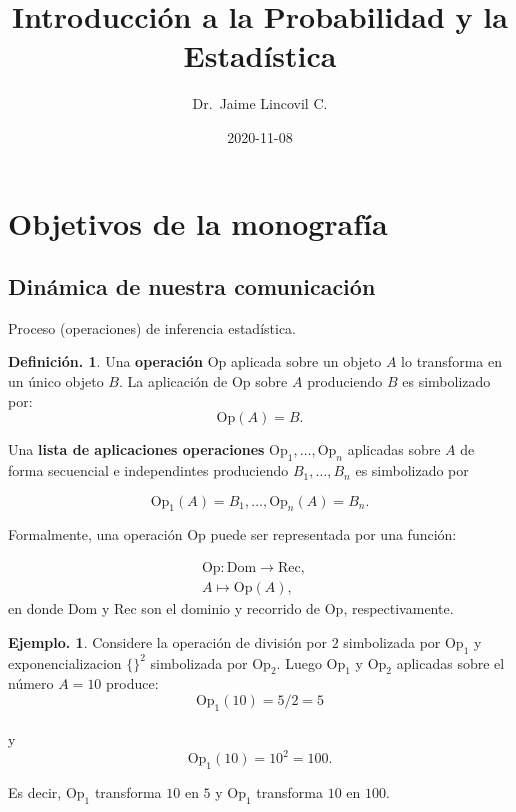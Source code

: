 \documentclass[]{book}
\title{Introducción a la Probabilidad y la Estadística}
\author{Dr.~Jaime Lincovil C.}
\date{2020-11-08}
\theoremstyle{definition}
\newtheorem{definition}{Definición.}[chapter]
\theoremstyle{definition}
\newtheorem{example}{Ejemplo.}[chapter]
\theoremstyle{definition}
\theoremstyle{remark}
\begin{document}
\maketitle

{
\setcounter{tocdepth}{1}
\tableofcontents
}
\hypertarget{objetivos-de-la-monografuxeda}{%
\chapter*{Objetivos de la monografía}\label{objetivos-de-la-monografuxeda}}

\hypertarget{dinuxe1mica-de-nuestra-comunicaciuxf3n}{%
\section*{Dinámica de nuestra comunicación}\label{dinuxe1mica-de-nuestra-comunicaciuxf3n}}

Proceso (operaciones) de inferencia estadística.

\begin{definition}
\protect\hypertarget{def:unnamed-chunk-1}{}{\label{def:unnamed-chunk-1} }Una \textbf{operación} Op aplicada sobre un objeto \(A\) lo transforma en
un único objeto \(B\). La aplicación de Op
sobre \(A\) produciendo \(B\) es simbolizado por:
\[\mbox{Op}(A)=B.\]

Una \textbf{lista de aplicaciones operaciones} \(\mbox{Op}_1, \ldots, \mbox{Op}_n\) aplicadas sobre \(A\) de forma secuencial e
independintes produciendo \(B_1, \ldots, B_n\) es simbolizado por

\[ \mbox{Op}_1 (A)=B_1, \ldots, \mbox{Op}_n (A) = B_n.  \]
\end{definition}

Formalmente, una operación Op puede ser representada por una
función:

\[
\begin{aligned}
\mbox{Op}: \mbox{Dom} \to \mbox{Rec}, & \\
A \mapsto \mbox{Op}(A),&
\end{aligned}
\]
en donde Dom y Rec son el dominio y recorrido de Op,
respectivamente.

\begin{example}
\protect\hypertarget{exm:unnamed-chunk-2}{}{\label{exm:unnamed-chunk-2} }Considere la operación de división por \(2\) simbolizada por
\(\mbox{Op}_1\) y exponencializacion \(\{ \}^2\) simbolizada por
\(\mbox{Op}_2\). Luego \(\mbox{Op}_1\) y \(\mbox{Op}_2\) aplicadas sobre
el número \(A=10\) produce:
\[ \mbox{Op}_1(10) = 5/2= 5  \]\\
y
\[ \mbox{Op}_1(10) =10^2 =100.  \]

Es decir, \(\mbox{Op}_1\) transforma \(10\) en \(5\) y \(\mbox{Op}_1\)
transforma \(10\) en \(100\).
\end{example}
\end{document}
